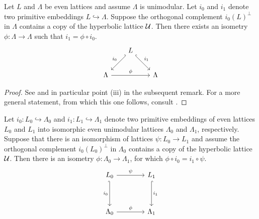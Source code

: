 \begin{proposition}
    \label{extending an isometry 1}
    Let $L$ and $\Lambda$ be even lattices and assume $\Lambda$ is unimodular. Let $i_0$ and $i_1$ denote two primitive embeddings $L \hookrightarrow \Lambda$. Suppose the orthogonal complement $i_0(L)^\perp$ in $\Lambda$ contains a copy of the hyperbolic lattice $\mathcal U$. Then there exists an isometry $\phi \colon \Lambda \to \Lambda$ such that $i_1 = \phi \circ i_0$.
    \[\begin{tikzcd}[row sep = 1em, column sep = 2em]
        & L \\
        \\
        \Lambda && \Lambda
        \arrow["{i_0}"', hook', from=1-2, to=3-1]
        \arrow["{i_1}", hook, from=1-2, to=3-3]
        \arrow["\phi", from=3-1, to=3-3]
    \end{tikzcd}\]
\end{proposition}

\begin{proof}
    See \cite[\S 14, Theorem 1.12]{Huybrechts2016} and in particular point (iii) in the subsequent remark. For a more general statement, from which this one follows, consult \cite[Theorem 1.14.4]{Nikulin1980}.
\end{proof}

\begin{corollary}
    \label{extending an isometry 2}
    Let $i_0 \colon L_0 \hookrightarrow \Lambda_0$ and $i_1 \colon L_1 \hookrightarrow \Lambda_1$ denote two primitive embeddings of even lattices $L_0$ and $L_1$ into isomorphic even unimodular lattices $\Lambda_0$ and $\Lambda_1$, respectively. Suppose that there is an isomorphism of lattices $\psi \colon L_0 \to L_1$ and assume the orthogonal complement $i_0(L_0)^\perp$ in $\Lambda_0$ contains a copy of the hyperbolic lattice $\mathcal U$. Then there is an isometry $\phi \colon \Lambda_0 \to \Lambda_1$, for which $\phi \circ i_0 = i_1 \circ \psi$.
    \[\begin{tikzcd}[column sep = 2em]
        {L_0} && {L_1} \\
        \\
        \Lambda_0 && \Lambda_1
        \arrow["\psi", from=1-1, to=1-3]
        \arrow["{i_0}"', hook', from=1-1, to=3-1]
        \arrow["{i_1}", hook, from=1-3, to=3-3]
        \arrow["\phi", from=3-1, to=3-3]
    \end{tikzcd}\]
\end{corollary}

